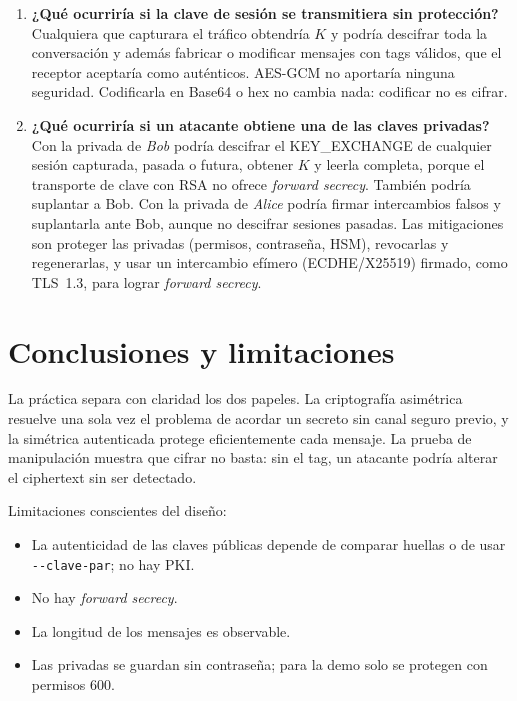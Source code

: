 \documentclass[11pt,a4paper]{article}
\begin{document}
\begin{enumerate}
\item \textbf{¿Qué ocurriría si la clave de sesión se transmitiera sin protección?}
  Cualquiera que capturara el tráfico obtendría $K$ y podría descifrar toda la conversación y
  además fabricar o modificar mensajes con tags válidos, que el receptor aceptaría como
  auténticos. AES-GCM no aportaría ninguna seguridad. Codificarla en Base64 o hex no cambia
  nada: codificar no es cifrar.

\item \textbf{¿Qué ocurriría si un atacante obtiene una de las claves privadas?}
  Con la privada de \emph{Bob} podría descifrar el KEY\_EXCHANGE de cualquier sesión capturada,
  pasada o futura, obtener $K$ y leerla completa, porque el transporte de clave con RSA no
  ofrece \emph{forward secrecy}. También podría suplantar a Bob. Con la privada de
  \emph{Alice} podría firmar intercambios falsos y suplantarla ante Bob, aunque no descifrar
  sesiones pasadas. Las mitigaciones son proteger las privadas (permisos, contraseña, HSM),
  revocarlas y regenerarlas, y usar un intercambio efímero (ECDHE/X25519) firmado, como TLS~1.3,
  para lograr \emph{forward secrecy}.
\end{enumerate}

\section{Conclusiones y limitaciones}

La práctica separa con claridad los dos papeles. La criptografía asimétrica resuelve una sola
vez el problema de acordar un secreto sin canal seguro previo, y la simétrica autenticada
protege eficientemente cada mensaje. La prueba de manipulación muestra que cifrar no basta:
sin el tag, un atacante podría alterar el ciphertext sin ser detectado.

Limitaciones conscientes del diseño:
\begin{itemize}
  \item La autenticidad de las claves públicas depende de comparar huellas o de usar
        \texttt{-{}-clave-par}; no hay PKI.
  \item No hay \emph{forward secrecy}.
  \item La longitud de los mensajes es observable.
  \item Las privadas se guardan sin contraseña; para la demo solo se protegen con permisos 600.
\end{itemize}
\end{document}
